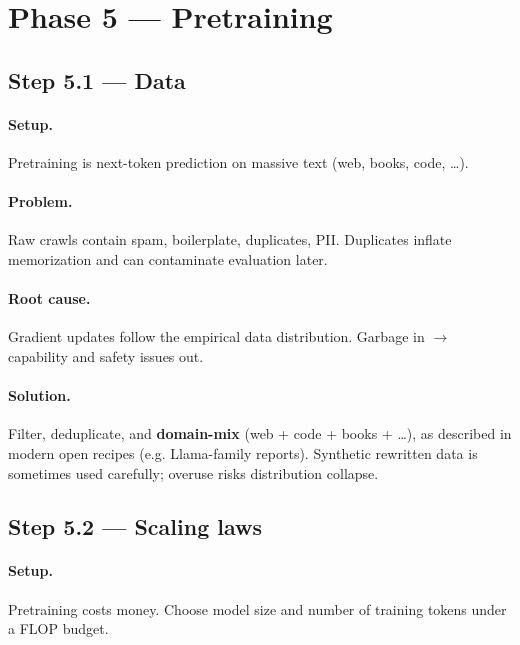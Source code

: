 \documentclass[11pt,a4paper]{article}
\begin{document}
\clearpage
\section{Phase 5 --- Pretraining}


\subsection{Step 5.1 --- Data}


\paragraph{Setup.}

Pretraining is next-token prediction on massive text (web, books, code, \ldots{}).


\paragraph{Problem.}

Raw crawls contain spam, boilerplate, duplicates, PII. Duplicates inflate memorization and can contaminate evaluation later.


\paragraph{Root cause.}

Gradient updates follow the empirical data distribution. Garbage in $\rightarrow$ capability and safety issues out.


\paragraph{Solution.}

Filter, deduplicate, and \textbf{domain-mix} (web + code + books + \ldots{}), as described in modern open recipes (e.g. Llama-family reports). Synthetic rewritten data is sometimes used carefully; overuse risks distribution collapse.


\subsection{Step 5.2 --- Scaling laws}


\paragraph{Setup.}

Pretraining costs money. Choose model size and number of training tokens under a FLOP budget.
\end{document}

